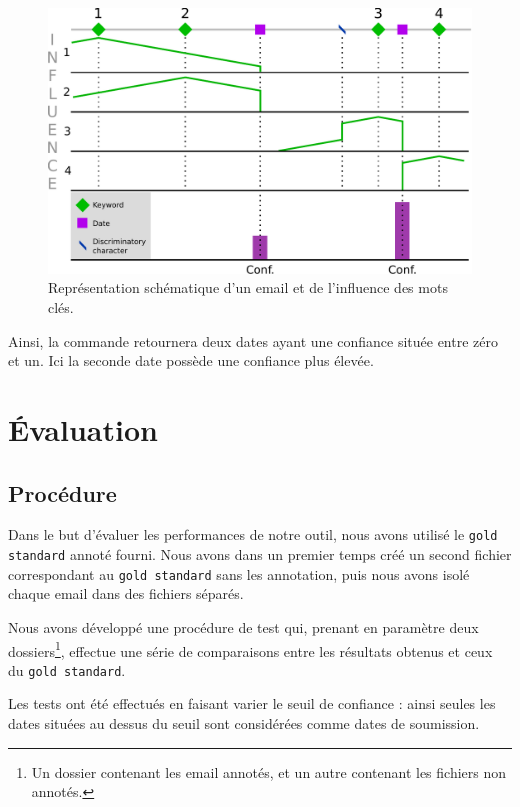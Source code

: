 \documentclass[a4paper,french,10pt]{article}
\begin{document}
\begin{figure}[H]
\includegraphics[width=\textwidth]{files/representation_email}
\caption{Représentation schématique d'un email et de l'influence des mots clés.}
\label{fig:representation_email}
\end{figure}

Ainsi, la commande retournera deux dates ayant une confiance située entre zéro et un. Ici la seconde date possède une confiance plus élevée.

\section{Évaluation}

\subsection{Procédure}

Dans le but d'évaluer les performances de notre outil, nous avons utilisé le \texttt{gold standard} annoté fourni. Nous avons dans un premier temps créé un second fichier correspondant au  \texttt{gold standard} sans les annotation, puis nous avons isolé chaque email dans des fichiers séparés.

Nous avons développé une procédure de test qui, prenant en paramètre deux dossiers\footnote{Un dossier contenant les email annotés, et un autre contenant les fichiers non annotés.}, effectue une série de comparaisons entre les résultats obtenus et ceux du \texttt{gold standard}.

Les tests ont été effectués en faisant varier le seuil de confiance : ainsi seules les dates situées au dessus du seuil sont considérées comme dates de soumission.
\end{document}
